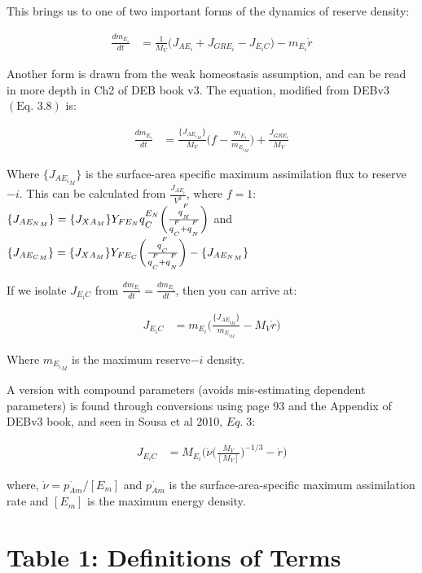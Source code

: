 \documentclass[
]{article}
\begin{document}
This brings us to one of two important forms of the dynamics of reserve
density:

\begin{align}
\frac{d{m_{E_i}}}{dt} &= \frac{1}{M_V}\biggl(J_{AE_{i}} + J_{GR{E_i}} - J_{E_{i}C}\biggr) - m_{E_i}\dot{r}
\end{align}

Another form is drawn from the weak homeostasis assumption, and can be
read in more depth in Ch2 of DEB book v3. The equation, modified from
DEBv3 \((\text{Eq. }3.8)\) is:

\begin{align}
\frac{dm_{E_i}}{dt} &= \frac{\{J_{{A{E_i}}_M}\}}{M_V}\biggl(f - \frac{m_{E_i}}{m_{{E_i}_M}}\biggr) + \frac{J_{GR{E_i}}}{M_V}
\end{align}

Where \(\{J_{{A{E_i}}_M}\}\) is the surface-area specific maximum
assimilation flux to reserve\(-i\). This can be calculated from
\(\frac{J_{A{E_i}}}{V^2}\), where \(f=1\):
\(\{J_{{A{E_N}}_M}\}=\{J_{X{A_M}}\}Y_{F{E_N}}q\strut_{C}^{E_N}\biggl(\frac{q\strut_{N}^{F}}{q\strut_{C}^{F} + q\strut_{N}^{F}}\biggr)\)
and
\(\{J_{{A{E_C}}_M}\}=\{J_{X{A_M}}\}Y_{F{E_C}}\biggl(\frac{q\strut_{C}^{F}}{q\strut_{C}^{F} + q\strut_{N}^{F}}\biggr)-\{J_{{A{E_N}}_M}\}\)

If we isolate \(J_{{E_i}C}\) from
\(\frac{dm_{E_i}}{dt}=\frac{dm_{E_i}}{dt}\), then you can arrive at:

\begin{align}
J_{{E_i}C} &= m_{E_i}\biggl(\frac{\{J_{{A{E_i}}_M}\}}{m_{{E_i}_M}} - {M_V}\dot{r}\biggr)
\end{align}

Where \(m_{{E_i}_M}\) is the maximum reserve\(-i\) density.

A version with compound parameters (avoids mis-estimating dependent
parameters) is found through conversions using page 93 and the Appendix
of DEBv3 book, and seen in Sousa et al 2010, \(Eq.\;3\):

\begin{align}
J_{{E_i}C} &= {M_{E_i}}\biggl(\dot{\nu}\biggl(\frac{M_V}{[M_V]}\biggr)^{-1/3} - \dot{r}\biggr)
\end{align}

where, \(\dot{\nu} = \dot{p_{Am}}/[E_{m}]\) and \(\dot{p_{Am}}\) is the
surface-area-specific maximum assimilation rate and \([E_m]\) is the
maximum energy density.

\newpage

\section{Table 1: Definitions of
Terms}\label{table-1-definitions-of-terms}
\end{document}
